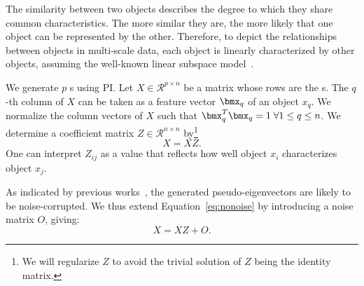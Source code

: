 The similarity between two objects describes the degree to which they share common characteristics.
The more similar they are, 
the more likely that one object can be represented by the other. 
Therefore,
to depict the relationships between objects in multi-scale data,
each object is linearly characterized by other objects,
assuming the well-known linear subspace model~\cite{liu2013robust}.

We generate $p$ {\pev}s using PI. 
Let $X\in \mathcal{R}^{p\times n}$ be a matrix whose rows are the {\pev}s.
The $q$-th column of $X$ can be taken as a feature vector $\bmx_q$ of an object $x_q$.
We normalize the column vectors of $X$ such that $\bmx_q^T \bmx_q = 1 \; \forall 1 \leq q \leq n$.
We determine a coefficient matrix $Z \in \mathcal{R}^{n \times n}$ by\footnote{We will regularize $Z$ to avoid the trivial solution of $Z$ being the identity matrix.}
\begin{equation}
\label{eq:nonoise}
X = XZ.
\end{equation} 
One can interpret $Z_{ij}$ 
as a value that reflects how well object $x_i$ characterizes object $x_j$.

As indicated by previous works~\cite{ye2016fuse}, the generated pseudo-eigenvectors are likely to be noise-corrupted.
We thus extend Equation~\ref{eq:nonoise} by introducing a noise matrix $O$, giving:
\begin{equation}
X = XZ + O.
\label{eq:O}
\end{equation} 

